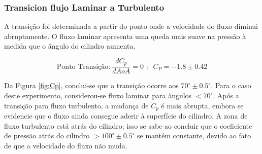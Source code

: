 \subsubsection{Transicion flujo Laminar a Turbulento}
A transição foi determinada a partir do ponto onde a velocidade do fluxo diminui abruptamente. O fluxo laminar apresenta uma queda mais suave na pressão à medida que o ângulo do cilindro aumenta.
    
\begin{equation}
   \text{Ponto Transição:}~  \frac{dC_{p}}{dAoA} = 0 ~~ ; ~~  C_P = -1.8 \pm 0.42
\end{equation}  


 Da Figura \ref{fig:Cp}, conclui-se que a transição ocorre aos $70^\circ \pm 0.5^\circ$. Para o caso deste experimento, considerou-se fluxo laminar para ângulos $<70^\circ$. Após a transição para fluxo turbulento, a mudança de $C_p$ é mais abrupta, embora se evidencie que o fluxo ainda consegue aderir à superfície do cilindro. A zona de fluxo turbulento está atrás do cilindro; isso se sabe ao concluir que o coeficiente de pressão atrás do cilindro $>100^\circ \pm 0.5^\circ$ se mantém constante, devido ao fato de que a velocidade do fluxo não muda.







